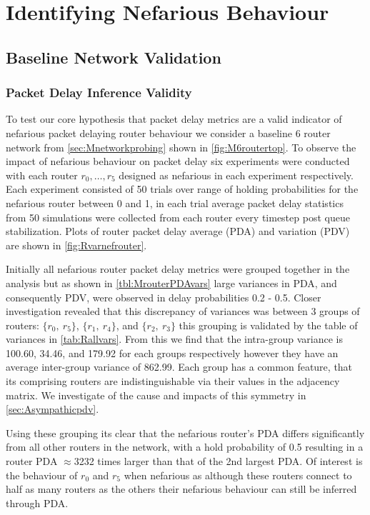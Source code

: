 \section{Identifying Nefarious Behaviour}
\label{sec:Rnefarouterdetection}

\subsection{Baseline Network Validation}
\subsubsection{Packet Delay Inference Validity}
To test our core hypothesis that packet delay metrics are a valid indicator of nefarious packet delaying router behaviour we consider a baseline 6 router network from \cref{sec:Mnetworkprobing} shown in \cref{fig:M6routertop}. To observe the impact of nefarious behaviour on packet delay six experiments were conducted with each router $r_0,\dots, r_5$ designed as nefarious in each experiment respectively. Each experiment consisted of 50 trials over range of holding probabilities for the nefarious router between 0 and 1, in each trial average packet delay statistics from 50 simulations were collected from each router every timestep post queue stabilization. Plots of router packet delay average (PDA) and variation (PDV) are shown in \cref{fig:Rvarnefrouter}.\par
Initially all nefarious router packet delay metrics were grouped together in the analysis but as shown in \cref{tbl:MrouterPDAvars} large variances in PDA, and consequently PDV, were observed in delay probabilities 0.2 - 0.5. Closer investigation revealed that this discrepancy of variances was between 3 groups of routers: $\{r_0,\ r_5\}$, $\{r_1,\ r_4\}$, and $\{r_2,\ r_3\}$ this grouping is validated by the table of variances in \cref{tab:Rallvars}. From this we find that the intra-group variance is 100.60, 34.46, and 179.92 for each groups respectively however they have an average inter-group variance of 862.99. Each group has a common feature, that its comprising routers are indistinguishable via their values in the adjacency matrix. We investigate of the cause and impacts of this symmetry in \cref{sec:Asympathicpdv}.\par
Using these grouping its clear that the nefarious router's PDA differs significantly from all other routers in the network, with a hold probability of 0.5 resulting in a router PDA $\approx$3232 times larger than that of the 2nd largest PDA. Of interest is the behaviour of $r_0$ and $r_5$ when nefarious as although these routers connect to half as many routers as the others their nefarious behaviour can still be inferred through PDA.\par

